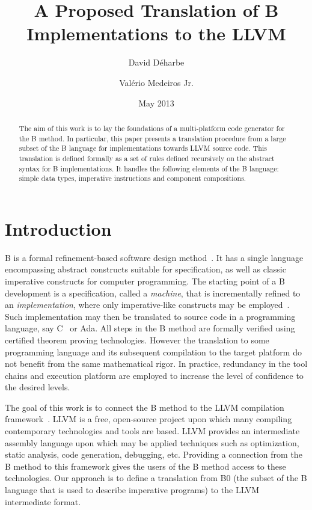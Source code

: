 \documentclass{llncs}
\title{A Proposed Translation of B Implementations to the LLVM}
\author{David D\'{e}harbe \inst{1} \and Val\'{e}rio Medeiros Jr.\inst{2}}
\institute{Federal University of Rio Grande do Norte, UFRN, Brazil\\
\and 
Federal Institute of Education, Science and Technology  of Rio Grande do Norte, IFRN, Brazil}
\date{May 2013}
\begin{document}
\maketitle

\begin{abstract}
  The aim of this work is to lay the foundations of a multi-platform code
  generator for the B method. In particular, this paper presents a translation
  procedure from a large subset of the B language for implementations towards
  LLVM source code. This translation is defined formally as a set of rules
  defined recursively on the abstract syntax for B implementations. It handles
  the following elements of the B language: simple data types, imperative
  instructions and component compositions. 
\end{abstract}

\section{Introduction}

B is a formal refinement-based software design method~\cite{Abrial1996}. It has
a single language encompassing abstract constructs suitable for specification,
as well as classic imperative constructs for computer programming. The starting
point of a B development is a specification, called a \emph{machine}, that is
incrementally refined to an \emph{implementation}, where only imperative-like
constructs may be employed~\cite{Clearsy}. Such implementation may then be
translated to source code in a programming language, say C~\cite{ComenC} or
Ada. All steps in the B method are formally verified using certified theorem
proving technologies. However the translation to some programming language and
its subsequent compilation to the target platform do not benefit from the same
mathematical rigor. In practice, redundancy in the tool chains and execution
platform are employed to increase the level of confidence to the desired levels.

The goal of this work is to connect the B method to the LLVM compilation
framework~\cite{Lattner04LLVM}.  LLVM is a free, open-source project upon which
many compiling contemporary technologies and tools are based. LLVM provides an
intermediate assembly language upon which may be applied techniques such as
optimization, static analysis, code generation, debugging, etc. Providing a
connection from the B method to this framework gives the users of the B method
access to these technologies. Our approach is to define a translation from B0
(the subset of the B language that is used to describe imperative programs) to
the LLVM intermediate format.
\end{document}
